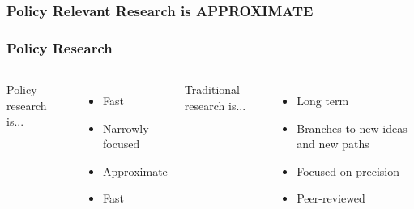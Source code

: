 \documentclass[12pt,handout]{beamer}
\begin{document}
{
\begin{frame}[plain]
\frametitle{Policy Relevant Research is APPROXIMATE}
\end{frame}
}


\begin{frame}
\frametitle{Policy Research}
  \begin{columns}
  Policy research is...
  \begin{itemize}
  \item Fast
  \item Narrowly focused
  \item Approximate
  \item Fast
  \pause
  \end{itemize}
  Traditional research is...
  \begin{itemize}
  \item Long term
  \pause
  \item Branches to new ideas and new paths
  \pause
  \item Focused on precision 
  \pause
  \item Peer-reviewed
  \end{itemize}
  \end{columns}
\end{frame}
\end{document}

